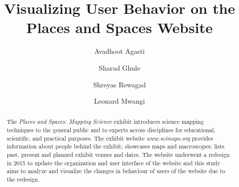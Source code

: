 \documentclass[sigconf]{acmart}
\begin{document}
\title{Visualizing User Behavior on the Places and Spaces Website}

\author{Avadhoot Agasti}

\author{Sharad Ghule}

\author{Shreyas Rewagad}

\author{Leonard Mwangi}


\begin{abstract}

The \textit{Places and Spaces: Mapping Science} exhibit introduces science mapping techniques to the general public and to experts across disciplines for educational, scientific, and practical purposes. The exhibit website \textit{www.scimaps.org} provides information about people behind the exhibit; showcases maps and macroscopes; lists past, present and planned exhibit venues and dates. The website underwent a redesign in 2015 to update the organization and user interface of the website and this study aims to analyze and visualize the changes in behaviour of users of the website due to the redesign. 
\end{abstract}



\maketitle























\appendix
\end{document}
